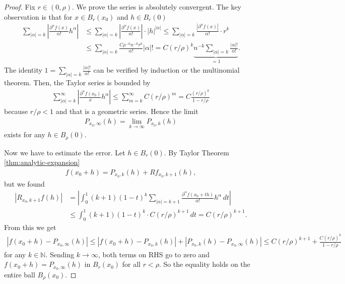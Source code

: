\begin{proof}
	Fix $r \in (0, \rho)$. We prove the series is absolutely convergent. The key observation is that for $x \in B_{r}(x_{0})$ and $h \in B_{r}(0)$
	\begin{align*}
		\sum_{\left| \alpha  \right| = k} \left| \frac{\partial^{\alpha }f(x)}{\alpha !} h^{\alpha } \right| & \leq \sum_{\left| \alpha  \right| = k} \left| \frac{\partial^{\alpha }f(x)}{\alpha !} \right| \cdot \left| h \right|^{\left| \alpha  \right|} \leq \sum_{\left| \alpha  \right| = k} \frac{|\partial^{\alpha }f(x)|}{\alpha !}  \cdot r^{k}   \\
		                                                                                                     & \leq \sum_{\left| \alpha  \right| = k} \frac{C \rho^{-k} n^{-k} r^{k}}{\alpha !} \left| \alpha  \right|! = C \left( r / \rho \right)^{k} \underbrace{n^{-k} \sum_{\left| \alpha  \right| = k} \frac{\left| \alpha  \right|!}{\alpha !}}_{=1}.
	\end{align*}
	The identity $1= \sum_{\left| \alpha  \right| = k} \frac{\left| \alpha  \right|!}{\alpha !}$ can be verified by induction or the multinomial theorem.
	Then, the Taylor series is bounded by
	\begin{align*}
		\sum_{\left| \alpha  \right| = k}^{\infty} \left| \frac{\partial^{\alpha } f(x_{0})}{x} h^{\alpha } \right| \leq \sum_{m=k}^{\infty} C \left( r / \rho \right)^{m} = C \frac{\left( r / \rho \right)^{k} }{1 - r / \rho}
	\end{align*}
	because $r / \rho < 1$ and that is a geometric series. Hence the limit
	\begin{align*}
		P_{x_{0}, \infty}(h) = \lim_{k \to \infty} P_{x_{0}, k}(h)
	\end{align*}
	exists for any $h \in B_{\rho}(0)$.

	Now we have to estimate the error. Let $h \in B_{r}(0)$. By Taylor Theorem \ref{thm:analytic-expansion}
	\begin{align*}
		f(x_{0} + h) = P_{x_{0}, k}(h) + Rf_{x_{0},k+1}(h),
	\end{align*}
	but we found
	\begin{align*}
		\left| R_{x_{0}, k+1}f(h) \right| & = \left| \int_{0}^{1} (k+1)(1-t)^{k} \sum_{\left| \alpha  \right| = k+1} \frac{\partial^{\alpha }f(x_{0} + th)}{\alpha !} h^{\alpha } \, dt \right| \\
		                                  & \leq \int_{0}^{1} (k+1)(1-t)^{k} \cdot C \left( r / \rho \right)^{k+1}  \, dt = C \left( r / \rho \right)^{k+1}.
	\end{align*}
	From this we get
	\begin{align*}
		\left| f(x_{0} + h) - P_{x_{0},\infty}(h) \right| \leq \left| f(x_{0}+h)-P_{x_{0},k}(h) \right| + \left| P_{x_{0},k}(h) - P_{x_{0}, \infty}(h) \right| \leq C \left( r / \rho \right)^{k+1} +  \frac{C \left( r / \rho \right)^{k}}{1- r / \rho}
	\end{align*}
	for any $k \in \mathbb{N}$. Sending $k \to \infty$, both terms on RHS go to zero and $f(x_{0} + h) = P_{x_{0}, \infty}(h)$ in $B_{r}(x_{0})$ for all $r < \rho$. So the equality holds on the entire ball $B_{\rho}(x_{0})$.
\end{proof}

